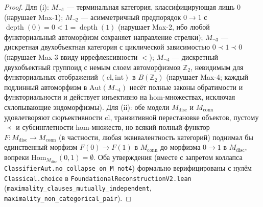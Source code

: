 \documentclass[11pt]{article}
\theoremstyle{plain}
\theoremstyle{definition}
\newcommand{\Hom}{\mathrm{Hom}}
\DeclareMathOperator{\dep}{depth}
\begin{document}
\begin{proof}
Для (i): $M_{\neg 1}$ — терминальная категория, классифицирующая лишь $0$ (нарушает Max-1); $M_{\neg 2}$ — асимметричный предпорядок $0 \to 1$ с $\dep(0) = 0 < 1 = \dep(1)$ (нарушает Max-2, ибо любой функториальный автоморфизм сохраняет направление стрелки); $M_{\neg 3}$ — дискретная двухобъектная категория с циклической зависимостью $0 \prec 1 \prec 0$ (нарушает Max-3 ввиду иррефлексивности $<$); $M_{\neg 4}$ — дискретный двухобъектный группоид с немым слоем автоморфизмов $\mathbb{Z}_2$, невидимым для функториальных отображений $(\mathrm{cl}, \mathrm{int})$ в $B(\mathbb{Z}_2)$ (нарушает Max-4; каждый подлинный автоморфизм в $\mathrm{Aut}(M_{\neg 4})$ несёт полные законы обратимости и функториальности и действует инъективно на hom-множествах, исключая схлопывающие эндоморфизмы). Для (ii): обе модели $M_{\mathrm{disc}}$ и $M_{\mathrm{conn}}$ удовлетворяют сюръективности $\mathrm{cl}$, транзитивной перестановке объектов, пустому $\prec$ и субсинглетности hom-множеств, но всякий полный функтор $F : M_{\mathrm{disc}} \to M_{\mathrm{conn}}$ (в частности, любая эквивалентность категорий) поднимал бы единственный морфизм $F(0) \to F(1)$ в $M_{\mathrm{conn}}$ до морфизма $0 \to 1$ в $M_{\mathrm{disc}}$, вопреки $\Hom_{M_{\mathrm{disc}}}(0, 1) = \emptyset$. Оба утверждения (вместе с запретом коллапса \texttt{ClassifierAut.no\_\allowbreak collapse\_\allowbreak on\_\allowbreak M\_not4}) формально верифицированы с нулём \texttt{Classical.choice} в \texttt{FoundationalReconstructionV2.lean} (\texttt{maximality\_\allowbreak clauses\_\allowbreak mutually\_\allowbreak independent}, \texttt{maximality\_\allowbreak non\_\allowbreak categorical\_\allowbreak pair}).
\end{proof}
\end{document}
